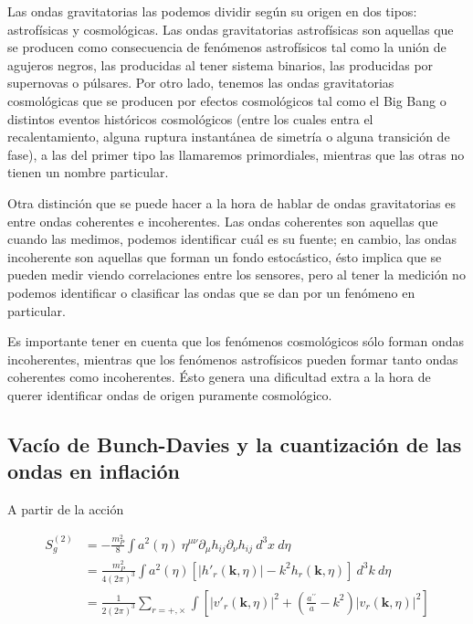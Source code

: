 Las ondas gravitatorias las podemos dividir según su origen en dos tipos: astrofísicas y cosmológicas. Las ondas gravitatorias astrofísicas son aquellas que se producen como consecuencia de fenómenos astrofísicos tal como la unión de agujeros negros, las producidas al tener sistema binarios, las producidas por supernovas o púlsares. Por otro lado, tenemos las ondas gravitatorias cosmológicas que se producen por efectos cosmológicos tal como el Big Bang o distintos eventos históricos cosmológicos (entre los cuales entra el recalentamiento, alguna ruptura instantánea de simetría o alguna transición de fase), a las del primer tipo las llamaremos primordiales, mientras que las otras no tienen un nombre particular.

Otra distinción que se puede hacer a la hora de hablar de ondas gravitatorias es entre ondas coherentes e incoherentes. Las ondas coherentes son aquellas que cuando las medimos, podemos identificar cuál es su fuente; en cambio, las ondas incoherente son aquellas que forman un fondo estocástico, ésto implica que se pueden medir viendo correlaciones entre los sensores, pero al tener la medición no podemos identificar o clasificar las ondas que se dan por un fenómeno en particular.

Es importante tener en cuenta que los fenómenos cosmológicos sólo forman ondas incoherentes, mientras que los fenómenos astrofísicos pueden formar tanto ondas coherentes como incoherentes. Ésto genera una dificultad extra a la hora de querer identificar ondas de origen puramente cosmológico.

\subsection{Vacío de Bunch-Davies y la cuantización de las ondas en inflación}

A partir de la acción

\begin{equation*}
    \begin{split} 
        S^{(2)}_g &= - \frac{m_P^2}{8} \int a^2 (\eta) \ \eta^{\mu \nu} \partial_\mu h_{ij} \partial_\nu h_{ij} \ d^3 x \ d\eta\\
        &= \frac{m^2_P}{4 (2 \pi)^3} \int a^2 (\eta) \left[ \left| h'_r (\textbf{k}, \eta) \right| - k^2 h_r (\textbf{k}, \eta) \right] \ d^3 k \ d \eta\\
        &= \frac{1}{2 (2 \pi)^3} \sum_{r = +, \times} \int \left[ \left| v'_r (\textbf{k}, \eta) \right|^2 + \left( \frac{a^{\prime \prime}}{a} - k^2 \right) \left| v_r (\textbf{k}, \eta) \right|^2 \right] 
    \end{split}
\end{equation*}

